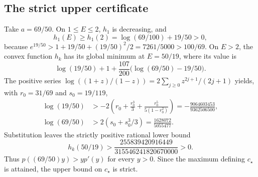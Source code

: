 \subsection{The strict upper certificate}
Take $a=69/50$. On $1\leq E\leq2$, $h_1$ is decreasing, and
\[
 h_1(E)\geq h_1(2)=\log(69/100)+19/50>0,
\]
because
$e^{19/50}>1+19/50+(19/50)^2/2=7261/5000>100/69$.
On $E>2$, the convex function $h_k$ has its global minimum at $E=50/19$,
where its value is
\[
 \log(19/50)+1+\frac{107}{200}\bigl(\log(69/50)-19/50\bigr).
\]
The positive series
$\log((1+z)/(1-z))=2\sum_{j\geq0}z^{2j+1}/(2j+1)$ yields, with
$r_0=31/69$ and $s_0=19/119$,
\begin{align*}
 \log(19/50)&>
 -2\left(r_0+\frac{r_0^3}3+\frac{r_0^5}{5(1-r_0^2)}\right)
 =-\frac{9064603453}{9362506500},\\
 \log(69/50)&>2(s_0+s_0^3/3)=\frac{1628072}{5055477}.
\end{align*}
Substitution leaves the strictly positive rational lower bound
\begin{equation}
 h_k(50/19)>
 \frac{255839420916449}{315546241820670000}>0.
 \label{eq:upper-certificate-margin}
\end{equation}
Thus $p((69/50)y)>yp'(y)$ for every $y>0$. Since the maximum defining
$c_\star$ is attained, the upper bound on $c_\star$ is strict.

